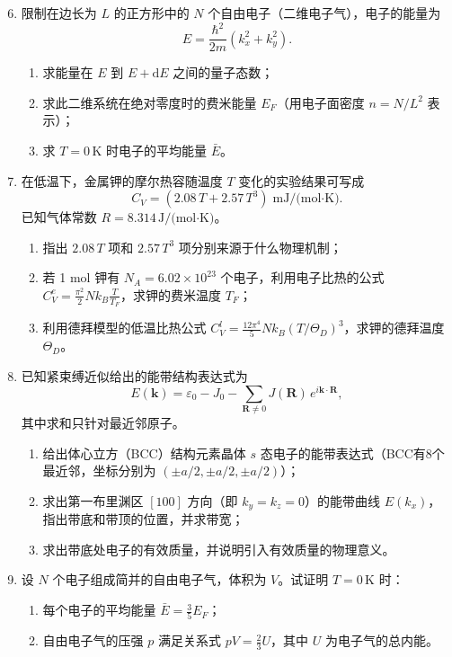 \documentclass[12pt,a4paper,fontset=mac]{ctexart}
\newcommand{\kk}{\mathbf{k}}
\newcommand{\RR}{\mathbf{R}}
\newcommand{\dd}{\mathrm{d}}
\newcommand{\calcanswer}{\vspace{8cm}}
\begin{document}
\begin{enumerate}
\setcounter{enumi}{5}
\item 限制在边长为 $L$ 的正方形中的 $N$ 个自由电子（二维电子气），电子的能量为
\[
E = \frac{\hbar^2}{2m}(k_x^2 + k_y^2).
\]
\begin{enumerate}
\item 求能量在 $E$ 到 $E + \dd E$ 之间的量子态数；
\item 求此二维系统在绝对零度时的费米能量 $E_F$（用电子面密度 $n = N/L^2$ 表示）；
\item 求 $T = 0\,\text{K}$ 时电子的平均能量 $\bar{E}$。
\end{enumerate}
\calcanswer

\item 在低温下，金属钾的摩尔热容随温度 $T$ 变化的实验结果可写成
\[
C_V = (2.08\,T + 2.57\,T^3)\;\text{mJ/(mol·K)}.
\]
已知气体常数 $R = 8.314\,\text{J/(mol·K)}$。
\begin{enumerate}
\item 指出 $2.08\,T$ 项和 $2.57\,T^3$ 项分别来源于什么物理机制；
\item 若 1 mol 钾有 $N_A = 6.02 \times 10^{23}$ 个电子，利用电子比热的公式 $C_V^e = \frac{\pi^2}{2}Nk_B\frac{T}{T_F}$，求钾的费米温度 $T_F$；
\item 利用德拜模型的低温比热公式 $C_V^l = \frac{12\pi^4}{5}Nk_B(T/\Theta_D)^3$，求钾的德拜温度 $\Theta_D$。
\end{enumerate}
\calcanswer

\newpage

\item 已知紧束缚近似给出的能带结构表达式为
\[
E(\kk) = \varepsilon_0 - J_0 - \sum_{\RR \neq 0} J(\RR)\,e^{i\kk\cdot\RR},
\]
其中求和只针对最近邻原子。
\begin{enumerate}
\item 给出体心立方（BCC）结构元素晶体 $s$ 态电子的能带表达式（BCC有8个最近邻，坐标分别为 $(\pm a/2, \pm a/2, \pm a/2)$）；
\item 求出第一布里渊区 $[100]$ 方向（即 $k_y = k_z = 0$）的能带曲线 $E(k_x)$，指出带底和带顶的位置，并求带宽；
\item 求出带底处电子的有效质量，并说明引入有效质量的物理意义。
\end{enumerate}
\calcanswer

\item 设 $N$ 个电子组成简并的自由电子气，体积为 $V$。试证明 $T = 0\,\text{K}$ 时：
\begin{enumerate}
\item 每个电子的平均能量 $\bar{E} = \frac{3}{5}E_F$；
\item 自由电子气的压强 $p$ 满足关系式 $pV = \frac{2}{3}U$，其中 $U$ 为电子气的总内能。
\end{enumerate}
\calcanswer

\end{enumerate}
\end{document}
